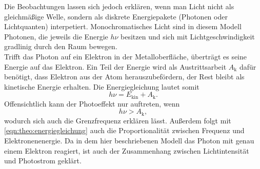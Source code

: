 Die Beobachtungen lassen sich jedoch erklären, wenn man Licht nicht als gleichmäßige
Welle, sondern als diskrete Energiepakete (Photonen oder Lichtquanten) interpetiert.
Monochromatisches Licht sind in diesem Modell Photonen, die jeweils die Energie $h\nu$
besitzen und sich mit Lichtgeschwindigkeit gradlinig durch den Raum bewegen.
\\
Trifft das Photon auf ein Elektron in der Metalloberfläche, überträgt es seine Energie auf
das Elektron. Ein Teil der Energie wird als Austrittsarbeit $A_\text{k}$ dafür benötigt,
dass Elektron aus der Atom herauszubefördern, der Rest bleibt als kinetische Energie
erhalten. Die Energiegleichung lautet somit
\begin{equation}
	\label{eqn:theo:energiegleichung}
	h\nu = E_\text{kin} + A_\text{k}.
\end{equation}
Offensichtlich kann der Photoeffekt nur auftreten, wenn 
\begin{equation}
	h\nu > A_\text{k},
\end{equation}
wodurch sich auch die Grenzfrequenz erklären lässt. Außerdem folgt mit
\autoref{eqn:theo:energiegleichung} auch die Proportionalität zwischen Frequenz und
Elektronenenergie. Da in dem hier beschriebenen Modell das Photon mit genau einem Elektron
reagiert, ist auch der Zusammenhang zwischen Lichtintensität und Photostrom geklärt.


